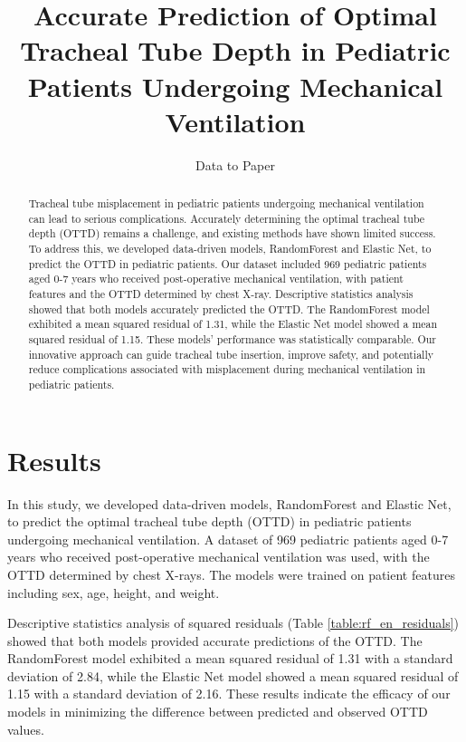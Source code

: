 \documentclass[11pt]{article}
\title{Accurate Prediction of Optimal Tracheal Tube Depth in Pediatric Patients Undergoing Mechanical Ventilation}
\author{Data to Paper}
\begin{document}
\maketitle
\begin{abstract}
Tracheal tube misplacement in pediatric patients undergoing mechanical ventilation can lead to serious complications. Accurately determining the optimal tracheal tube depth (OTTD) remains a challenge, and existing methods have shown limited success. To address this, we developed data-driven models, RandomForest and Elastic Net, to predict the OTTD in pediatric patients. Our dataset included 969 pediatric patients aged 0-7 years who received post-operative mechanical ventilation, with patient features and the OTTD determined by chest X-ray. Descriptive statistics analysis showed that both models accurately predicted the OTTD. The RandomForest model exhibited a mean squared residual of 1.31, while the Elastic Net model showed a mean squared residual of 1.15. These models' performance was statistically comparable. Our innovative approach can guide tracheal tube insertion, improve safety, and potentially reduce complications associated with misplacement during mechanical ventilation in pediatric patients.
\end{abstract}
\section*{Results}

In this study, we developed data-driven models, RandomForest and Elastic Net, to predict the optimal tracheal tube depth (OTTD) in pediatric patients undergoing mechanical ventilation. A dataset of 969 pediatric patients aged 0-7 years who received post-operative mechanical ventilation was used, with the OTTD determined by chest X-rays. The models were trained on patient features including sex, age, height, and weight.

Descriptive statistics analysis of squared residuals (Table \ref{table:rf_en_residuals}) showed that both models provided accurate predictions of the OTTD. The RandomForest model exhibited a mean squared residual of 1.31 with a standard deviation of 2.84, while the Elastic Net model showed a mean squared residual of 1.15 with a standard deviation of 2.16. These results indicate the efficacy of our models in minimizing the difference between predicted and observed OTTD values.
\end{document}
